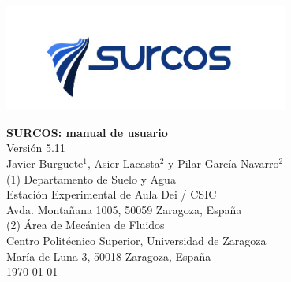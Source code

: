 \documentclass[11pt, twoside, openany, a4paper]{book}
\begin{document}

\nocite{*}

\renewcommand{\tablename}{Tabla}
\renewcommand{\listtablename}{Índice de tablas}
\renewcommand{\bibname}{Bibliografía}

\pagestyle{empty}

\begin{titlepage} 
\begin{center} 
 
\includegraphics*[height=3.5cm]{images/logo_surcos.png} 

\vspace*{3.5cm} 
{\Huge \textbf{SURCOS: manual de usuario\\}}
\vspace*{1cm} 
{\normalsize Versión 5.11}\\
\vspace*{1cm} 
{\Large Javier Burguete$^1$, Asier Lacasta$^2$ y Pilar García-Navarro$^2$}\\ 
\vspace*{2.5cm} 
{\normalsize (1) Departamento de Suelo y Agua}\\
{Estación Experimental de Aula Dei / CSIC}\\ 
{Avda. Montañana 1005, 50059 Zaragoza, España}\\ 
\vspace*{1cm} 
{\normalsize (2) Área de Mecánica de Fluidos}\\ 
{Centro Politécnico Superior, Universidad de Zaragoza}\\
{María de Luna 3, 50018 Zaragoza, España}\\
\vspace*{1cm} 
{\normalsize \today}\\ 
\end{center} 
\end{titlepage} 
\cleardoublepage

\pagestyle{plain}

\tableofcontents
\listoffigures

\cleardoublepage

\pagestyle{headings}


\cleardoublepage


\cleardoublepage


\cleardoublepage

%
\end{document}
